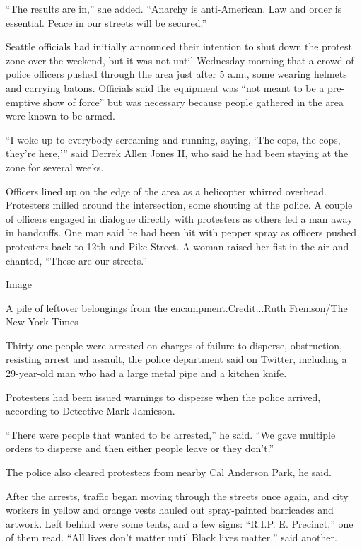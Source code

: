 ``The results are in,'' she added. ``Anarchy is anti-American. Law and
order is essential. Peace in our streets will be secured.''

Seattle officials had initially announced their intention to shut down
the protest zone over the weekend, but it was not until Wednesday
morning that a crowd of police officers pushed through the area just
after 5 a.m.,
\href{https://twitter.com/MichaelReports/status/1278307571799977985?s=20}{some
wearing helmets and carrying batons.} Officials said the equipment was
``not meant to be a pre-emptive show of force'' but was necessary
because people gathered in the area were known to be armed.

``I woke up to everybody screaming and running, saying, `The cops, the
cops, they're here,''' said Derrek Allen Jones II, who said he had been
staying at the zone for several weeks.

Officers lined up on the edge of the area as a helicopter whirred
overhead. Protesters milled around the intersection, some shouting at
the police. A couple of officers engaged in dialogue directly with
protesters as others led a man away in handcuffs. One man said he had
been hit with pepper spray as officers pushed protesters back to 12th
and Pike Street. A woman raised her fist in the air and chanted, ``These
are our streets.''

Image

A pile of leftover belongings from the encampment.Credit...Ruth
Fremson/The New York Times

Thirty-one people were arrested on charges of failure to disperse,
obstruction, resisting arrest and assault, the police department
\href{https://twitter.com/SeattlePD/status/1278342077311406081}{said on
Twitter}, including a 29-year-old man who had a large metal pipe and a
kitchen knife.

Protesters had been issued warnings to disperse when the police arrived,
according to Detective Mark Jamieson.

``There were people that wanted to be arrested,'' he said. ``We gave
multiple orders to disperse and then either people leave or they
don't.''

The police also cleared protesters from nearby Cal Anderson Park, he
said.

After the arrests, traffic began moving through the streets once again,
and city workers in yellow and orange vests hauled out spray-painted
barricades and artwork. Left behind were some tents, and a few signs:
``R.I.P. E. Precinct,'' one of them read. ``All lives don't matter until
Black lives matter,'' said another.

